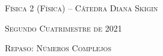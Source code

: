 \documentclass[11pt,spanish]{article}
\begin{document}
    \begin{center}
    \textsc{\large Física 2 (Física) -- Cátedra Diana Skigin}
    \par\end{center}{\large \par}
    
    \begin{center}
    \textsc{\large Segundo Cuatrimestre de 2021}
    \par\end{center}{\large \par}
    
    \begin{center}
    \textsc{\large Repaso: Números Complejos}
    \par\end{center}{\large \par}
\end{document}
